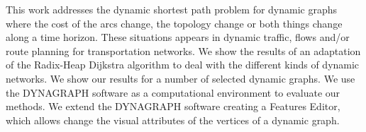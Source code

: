 This work addresses the dynamic shortest path problem for dynamic
graphs where the cost of the arcs change, the topology change or both things
change along a time horizon. These situations appears in dynamic traffic, flows and/or
route planning for transportation networks.
We show the results of an adaptation of the Radix-Heap Dijkstra algorithm to
deal with the different kinds of dynamic networks. We show our results for
a number of selected dynamic graphs. We use the DYNAGRAPH software as a computational
environment to evaluate our methods.
We extend the DYNAGRAPH software creating a Features Editor, which allows
change the visual attributes of the vertices of a dynamic graph.

